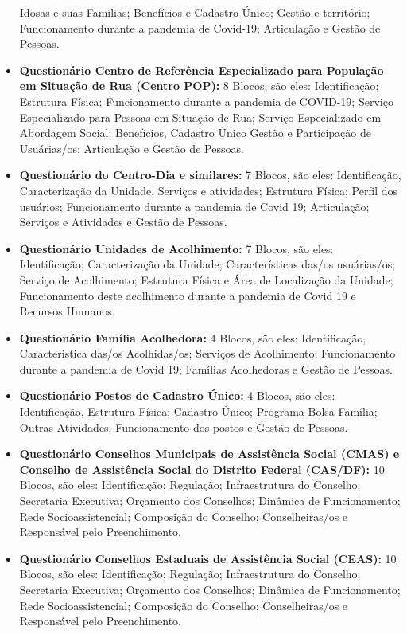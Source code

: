 \documentclass[
  letterpaper,
  DIV=11,
  numbers=noendperiod]{scrreprt}
\begin{document}
\begin{itemize}
  Idosas e suas Famílias; Benefícios e Cadastro Único; Gestão e
  território; Funcionamento durante a pandemia de Covid-19; Articulação
  e Gestão de Pessoas.
\item
  \textbf{Questionário Centro de Referência Especializado para População
  em Situação de Rua (Centro POP):} 8 Blocos, são eles: Identificação;
  Estrutura Física; Funcionamento durante a pandemia de COVID-19;
  Serviço Especializado para Pessoas em Situação de Rua; Serviço
  Especializado em Abordagem Social; Benefícios, Cadastro Único Gestão e
  Participação de Usuárias/os; Articulação e Gestão de Pessoas.
\item
  \textbf{Questionário do Centro-Dia e similares:} 7 Blocos, são eles:
  Identificação, Caracterização da Unidade, Serviços e atividades;
  Estrutura Física; Perfil dos usuários; Funcionamento durante a
  pandemia de Covid 19; Articulação; Serviços e Atividades e Gestão de
  Pessoas.
\item
  \textbf{Questionário Unidades de Acolhimento:} 7 Blocos, são eles:
  Identificação; Caracterização da Unidade; Características das/os
  usuárias/os; Serviço de Acolhimento; Estrutura Física e Área de
  Localização da Unidade; Funcionamento deste acolhimento durante a
  pandemia de Covid 19 e Recursos Humanos.
\item
  \textbf{Questionário Família Acolhedora:} 4 Blocos, são eles:
  Identificação, Caracteristica das/os Acolhidas/os; Serviços de
  Acolhimento; Funcionamento durante a pandemia de Covid 19; Famílias
  Acolhedoras e Gestão de Pessoas.
\item
  \textbf{Questionário Postos de Cadastro Único:} 4 Blocos, são eles:
  Identificação, Estrutura Física; Cadastro Único; Programa Bolsa
  Família; Outras Atividades; Funcionamento dos postos e Gestão de
  Pessoas.
\item
  \textbf{Questionário Conselhos Municipais de Assistência Social (CMAS)
  e Conselho de Assistência Social do Distrito Federal (CAS/DF):} 10
  Blocos, são eles: Identificação; Regulação; Infraestrutura do
  Conselho; Secretaria Executiva; Orçamento dos Conselhos; Dinâmica de
  Funcionamento; Rede Socioassistencial; Composição do Conselho;
  Conselheiras/os e Responsável pelo Preenchimento.
\item
  \textbf{Questionário Conselhos Estaduais de Assistência Social
  (CEAS):} 10 Blocos, são eles: Identificação; Regulação; Infraestrutura
  do Conselho; Secretaria Executiva; Orçamento dos Conselhos; Dinâmica
  de Funcionamento; Rede Socioassistencial; Composição do Conselho;
  Conselheiras/os e Responsável pelo Preenchimento.
\end{itemize}
\end{document}
